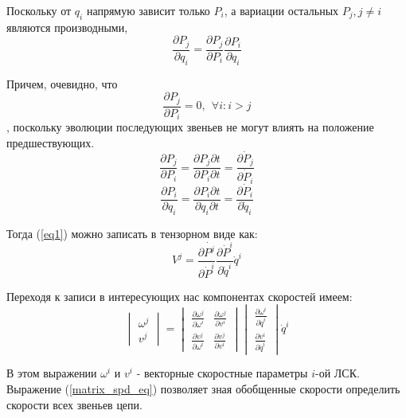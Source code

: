 \documentclass[12pt,a4paper,titlepage]{article}
\begin{document}
Поскольку от $q_i$ напрямую зависит только $P_i$, а вариации остальных $P_j, j \neq i$ являются производными,
\begin{equation}\label{}
\frac{\partial{P_j}}{\partial{q_i}} = \frac{\partial{P_j}}{\partial{P_i}}\frac{\partial{P_i}}{\partial{q_i}}
\end{equation}

Причем, очевидно, что 
\begin{equation}\label{}
\frac{\partial{P_j}}{\partial{P_i}} = 0, \ \ \forall i: i > j
\end{equation}
, поскольку эволюции последующих звеньев не могут влиять на положение предшествующих.
\begin{equation}\label{}
\frac{\partial{P_j}}{\partial{P_i}} = \frac{\partial{P_j}\partial{t}}{\partial{P_i}\partial{t}} = \frac{\partial{\dot{P}_j}}{\partial{\dot{P}_i}}
\end{equation}
\begin{equation}\label{}
\frac{\partial{P_i}}{\partial{q_i}} = \frac{\partial{P_i}\partial{t}}{\partial{q_i}\partial{t}} = \frac{\partial{\dot{P}_i}}{\partial{\dot{q}_i}}
\end{equation}

Тогда (\ref{eq1}) можно записать в тензорном виде как:
\begin{equation}\label{eq2}
V^j = \frac{\partial{\dot{P^j}}}{\partial{\dot{P}^i}}\frac{\partial{\dot{P}^i}}{\partial{\dot{q}^i}}\dot{q}^i 
\end{equation}

Переходя к записи в интересующих нас компонентах скоростей имеем:
\begin{equation}\label{matrix_spd_eq}
\begin{vmatrix}
\omega^j\\
v^j
\end{vmatrix}
=
\begin{vmatrix}
\frac{\partial{\omega^j}}{\partial{\omega^i}} & \frac{\partial{\omega^j}}{\partial{v^i}} \\
\frac{\partial{v^j}}{\partial{\omega^i}} & \frac{\partial{v^j}}{\partial{v^i}}
\end{vmatrix}
\begin{vmatrix}
\frac{\partial{\omega^i}}{\partial{\dot{q}^i}}\\
\frac{\partial{v^i}}{\partial{\dot{q}^i}}
\end{vmatrix}
\dot{q}^i
\end{equation}

В этом выражении $\omega^i$ и $v^i$ - векторные скоростные параметры $i$-ой ЛСК. Выражение (\ref{matrix_spd_eq}) позволяет зная обобщенные скорости определить скорости всех звеньев цепи. 
\end{document}
